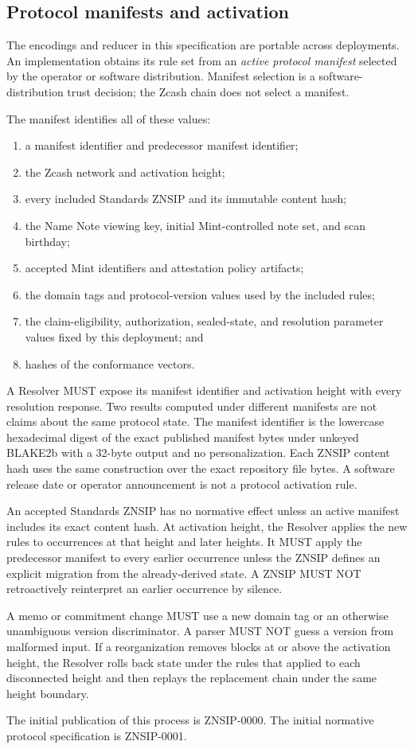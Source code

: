 \subsection{Protocol manifests and activation}

The encodings and reducer in this specification are portable across deployments.
An implementation obtains its rule set from an \emph{active protocol manifest} selected by the operator or software distribution.
Manifest selection is a software-distribution trust decision; the Zcash chain does not select a \zns{} manifest.

The manifest identifies all of these values:

\begin{enumerate}
  \item a manifest identifier and predecessor manifest identifier;
  \item the Zcash network and activation height;
  \item every included Standards ZNSIP and its immutable content hash;
  \item the Name Note viewing key, initial Mint-controlled note set, and scan birthday;
  \item accepted Mint identifiers and attestation policy artifacts;
  \item the domain tags and protocol-version values used by the included rules;
  \item the claim-eligibility, authorization, sealed-state, and resolution parameter values fixed by this deployment; and
  \item hashes of the conformance vectors.
\end{enumerate}

A Resolver MUST expose its manifest identifier and activation height with every resolution response.
Two results computed under different manifests are not claims about the same protocol state.
The manifest identifier is the lowercase hexadecimal digest of the exact published manifest bytes under unkeyed BLAKE2b with a 32-byte output and no personalization.
Each ZNSIP content hash uses the same construction over the exact repository file bytes.
A software release date or operator announcement is not a protocol activation rule.

An accepted Standards ZNSIP has no normative effect unless an active manifest includes its exact content hash.
At activation height, the Resolver applies the new rules to occurrences at that height and later heights.
It MUST apply the predecessor manifest to every earlier occurrence unless the ZNSIP defines an explicit migration from the already-derived state.
A ZNSIP MUST NOT retroactively reinterpret an earlier occurrence by silence.

A memo or commitment change MUST use a new domain tag or an otherwise unambiguous version discriminator.
A parser MUST NOT guess a version from malformed input.
If a reorganization removes blocks at or above the activation height, the Resolver rolls back state under the rules that applied to each disconnected height and then replays the replacement chain under the same height boundary.

The initial publication of this process is ZNSIP-0000.
The initial normative protocol specification is ZNSIP-0001.

